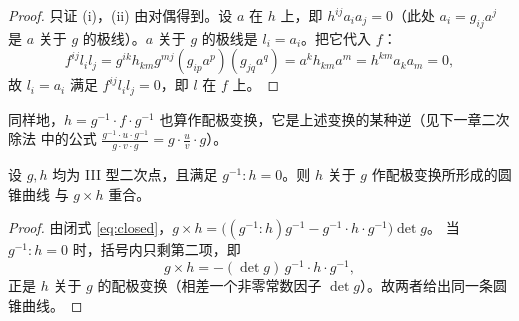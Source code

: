 \begin{proof}
只证 (i)，(ii) 由对偶得到。设 $a$ 在 $h$ 上，即 $h^{ij}a_ia_j=0$（此处 $a_i=g_{ij}a^j$ 是 $a$
关于 $g$ 的极线）。$a$ 关于 $g$ 的极线是 $l_i=a_i$。把它代入 $f$：
\[
f^{ij}l_il_j=g^{ik}h_{km}g^{mj}(g_{ip}a^p)(g_{jq}a^q)
=a^k h_{km}a^m=h^{km}a_ka_m=0 ,
\]
故 $l_i=a_i$ 满足 $f^{ij}l_il_j=0$，即 $l$ 在 $f$ 上。
\end{proof}

同样地，$h=g^{-1}\cdot f\cdot g^{-1}$ 也算作配极变换，它是上述变换的某种逆（见下一章二次除法
中的公式 $\frac{g^{-1}\cdot u\cdot g^{-1}}{g\cdot v\cdot g}=g\cdot\frac uv\cdot g$）。

\begin{proposition}
设 $g,h$ 均为 III 型二次点，且满足 $g^{-1}:h=0$。则 $h$ 关于 $g$ 作配极变换所形成的圆锥曲线
与 $g\times h$ 重合。
\end{proposition}

\begin{proof}
由闭式 \eqref{eq:closed}，$g\times h=\big((g^{-1}:h)g^{-1}-g^{-1}\cdot h\cdot g^{-1}\big)\det g$。
当 $g^{-1}:h=0$ 时，括号内只剩第二项，即
\[
g\times h=-(\det g)\,g^{-1}\cdot h\cdot g^{-1},
\]
正是 $h$ 关于 $g$ 的配极变换（相差一个非零常数因子 $\det g$）。故两者给出同一条圆锥曲线。
\end{proof}
